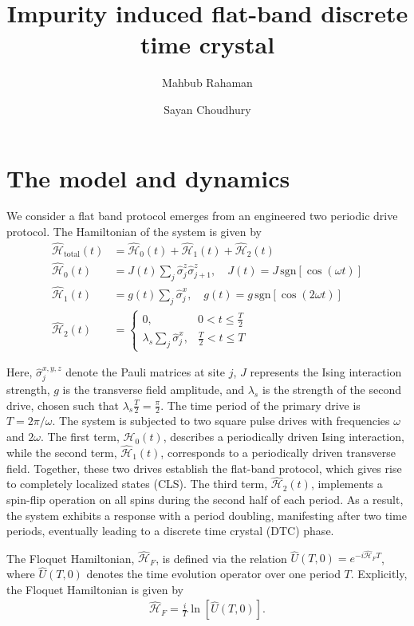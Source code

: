 \documentclass[a4paper,10pt]{article}
\title{Impurity induced flat-band discrete time crystal}
\author[1]{Mahbub Rahaman}
\author[1]{Sayan Choudhury}
\affil[1]{\small Harish-Chandra Research Institute, HBNI, Chhatnag Road, Jhunsi, Praygraj, UP - 211019, India}
\date{}
\begin{document}
\maketitle

\section{The model and dynamics}
We consider a flat band protocol emerges from an engineered two periodic drive protocol. The Hamiltonian of the system is given by
\begin{align}
    \hat{\mathcal{H}}_{\text{total}}(t) &=  \hat{\mathcal{H}}_0(t) + \hat{\mathcal{H}}_1(t)  + \hat{\mathcal{H}}_2(t) \\
    \hat{\mathcal{H}}_0(t) &= J(t)\sum_{j} \hat{\sigma}_j^z \hat{\sigma}_{j+1}^z, \quad J(t) = J\, \mathrm{sgn}[\cos(\omega t)] \\
    \hat{\mathcal{H}}_1(t) &= g(t)\sum_{j}\hat{\sigma}_j^x, \quad g(t) = g\, \mathrm{sgn}[\cos(2 \omega t)] \\
    \hat{\mathcal{H}}_2(t) &=
    \begin{cases}
        0, & 0 < t \leq \frac{T}{2} \\
        \lambda_s \sum_{j}\hat{\sigma}_j^x, & \frac{T}{2} < t \leq T
    \end{cases}
\end{align}

Here, $\hat{\sigma}_j^{x,y,z}$ denote the Pauli matrices at site $j$, $J$ represents the Ising interaction strength, $g$ is the transverse field amplitude, and $\lambda_s$ is the strength of the second drive, chosen such that $\lambda_s \frac{T}{2} = \frac{\pi}{2}$. The time period of the primary drive is $T = 2\pi/\omega$. The system is subjected to two square pulse drives with frequencies $\omega$ and $2\omega$. The first term, $\hat{\mathcal{H}}_0(t)$, describes a periodically driven Ising interaction, while the second term, $\hat{\mathcal{H}}_1(t)$, corresponds to a periodically driven transverse field. Together, these two drives establish the flat-band protocol, which gives rise to completely localized states (CLS). The third term, $\hat{\mathcal{H}}_2(t)$, implements a spin-flip operation on all spins during the second half of each period. As a result, the system exhibits a response with a period doubling, manifesting after two time periods, eventually leading to a discrete time crystal (DTC) phase.

The Floquet Hamiltonian, $\hat{\mathcal{H}}_F$, is defined via the relation $\hat{U}(T,0) = e^{-i \hat{\mathcal{H}}_F T}$, where $\hat{U}(T,0)$ denotes the time evolution operator over one period $T$. Explicitly, the Floquet Hamiltonian is given by
\begin{align}
    \hat{\mathcal{H}}_F = \frac{i}{T} \ln[\hat{U}(T,0)].
\end{align}
\end{document}
